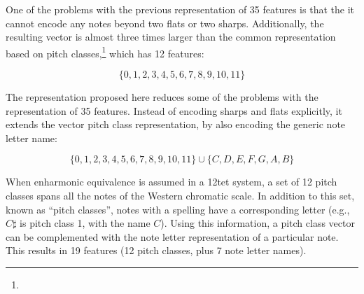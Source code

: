 
One of the problems with the previous representation of 35
features is that the it cannot encode any notes beyond two
flats or two sharps. Additionally, the resulting vector is
almost three times larger than the common representation
based on pitch classes,\footnote{} which has 12 features:

\begin{equation}
    \{0, 1, 2, 3, 4, 5, 6, 7, 8, 9, 10, 11\}
\end{equation}

The representation proposed here reduces some of the
problems with the representation of 35 features. Instead of
encoding sharps and flats explicitly, it extends the vector
pitch class representation, by also encoding the generic
note letter name:

\begin{equation}
    \{0, 1, 2, 3, 4, 5, 6, 7, 8, 9, 10, 11\} \cup \{C, D, E, F, G, A, B\}
\end{equation}

When enharmonic equivalence is assumed in a \gls{12tet}
system, a set of 12 pitch classes spans all the notes of the
Western chromatic scale. In addition to this set, known as
``pitch classes'', notes with a spelling have a
corresponding letter (e.g., $C\sharp$ is pitch class 1, with
the name $C$). Using this information, a pitch class vector
can be complemented with the note letter representation of a
particular note. This results in 19 features (12 pitch
classes, plus 7 note letter names).
